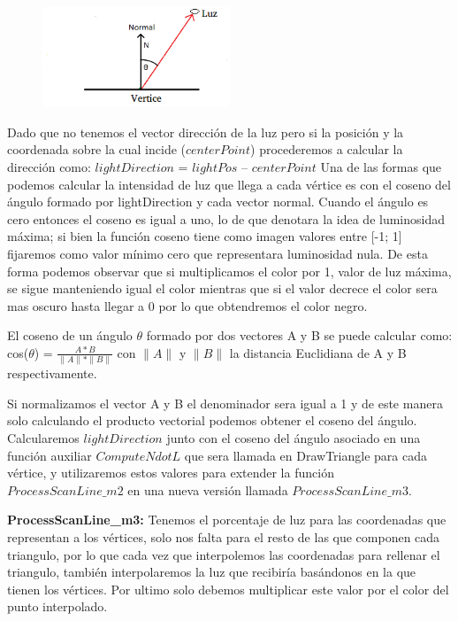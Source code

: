 \documentclass[a4paper]{article}
\newcounter{col}
\begin{document}
        
        \begin{figure}[h]
    \centering
    \includegraphics[width=0.50\textwidth]{Imagenes/f.png}
    \caption{}
    \label{fig:mesh1}
\end{figure}
        Dado que no tenemos el vector dirección de la luz pero si la posición y la coordenada sobre la cual incide ($centerPoint$) procederemos a calcular la dirección como:
 $lightDirection$  = $lightPos$ – $centerPoint$
        Una de las formas que podemos calcular la intensidad de luz que llega a cada vértice es con el coseno del ángulo formado por lightDirection y cada vector normal. Cuando el ángulo es cero entonces el coseno es igual a uno, lo de que denotara la idea de luminosidad máxima; si bien la función coseno tiene como imagen valores entre [-1; 1] fijaremos como valor mínimo cero que representara luminosidad nula. De esta forma podemos observar que si multiplicamos el color por 1, valor de luz máxima, se sigue manteniendo igual el color mientras que si el valor decrece el color sera mas oscuro hasta llegar  a 0 por lo que obtendremos el color negro. 
\par El coseno de un ángulo $\theta$ formado por dos vectores A y B se puede calcular como:
cos($\theta$) = $\frac{A*B}{\parallel A \parallel*\parallel B \parallel}$ 
con $\parallel A \parallel$ y $\parallel B \parallel$ la distancia Euclidiana de A y B respectivamente.
 
Si normalizamos el vector A y B el denominador  sera igual a  1 y de este manera solo calculando el producto vectorial podemos obtener el coseno del ángulo. 
Calcularemos $lightDirection$ junto con el coseno del ángulo asociado en una función auxiliar $ComputeNdotL$ que sera llamada en DrawTriangle para cada vértice, y utilizaremos estos valores para extender la función $ProcessScanLine\_m2$ en una nueva versión llamada $ProcessScanLine\_m3$.
   
\textbf{ ProcessScanLine\_m3:}
Tenemos el porcentaje de luz para las coordenadas que representan a los vértices, solo nos falta para el resto de las que componen cada triangulo,  por lo que cada vez que interpolemos las coordenadas para rellenar el triangulo, también interpolaremos la luz que recibiría  basándonos en la que tienen los vértices. Por ultimo solo debemos multiplicar este valor por el color del punto interpolado.  
\end{document}
